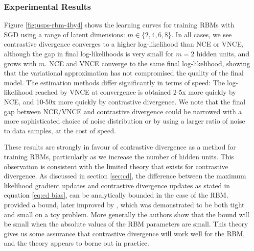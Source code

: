 \documentclass[11pt, oneside]{article}
\theoremstyle{definition}
\begin{document}
{%

\subsubsection{Experimental Results}

Figure \ref{fig:usps-rbm-4by4} shows the learning curves for training RBMs with SGD using a range of latent dimensions: $m \in \{2, 4, 6, 8\}$. In all cases, we see contrastive divergence converges to a higher log-likelihood than NCE or VNCE, although the gap in final log-likelihoods is very small for $m=2$ hidden units, and grows with $m$. NCE and VNCE converge to the same final log-likelihood, showing that the variational approximation has not compromised the quality of the final model. The estimation methods differ significantly in terms of speed: The log-likelihood reached by VNCE at convergence is obtained 2-5x more quickly by NCE, and 10-50x more quickly by contrastive divergence. We note that the final gap between NCE/VNCE and contrastive divergence could be narrowed with a more sophisticated choice of noise distribution or by using a larger ratio of noise to data samples, at the cost of speed.

These results are strongly in favour of contrastive divergence as a method for training RBMs, particularly as we increase the number of hidden units. This observation is consistent with the limited theory that exists for contrastive divergence. As discussed in section \ref{sec:cd}, the difference between the maximum likelihood gradient updates and contrastive divergence updates as stated in equation \ref{eq:cd bias}, can be analytically bounded in the case of the RBM. \citet{bengio2009justifying} provided a bound, later improved by \citet{fischer2011bounding}, which was demonstrated to be both tight and small on a toy problem. More generally the authors show that the bound will be small when the absolute values of the RBM parameters are small. This theory gives us some assurance that contrastive divergence will work well for the RBM, and the theory appears to borne out in practice.

}
\end{document}
